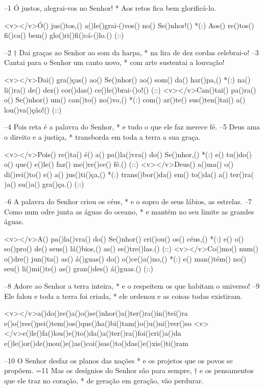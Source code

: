 –1 Ó justos, alegrai-vos no Senhor! *
Aos retos fica bem glorificá-lo.


<v></v>Ó() jus()tos,() a()le()grai-()vos() no() Se()nhor!() *(:)
Aos() re()tos() fi()ca() bem() glo()ri()fi()cá-()lo.() (::)

–2 † Dai graças ao Senhor ao som da harpa, *
na lira de dez cordas celebrai-o!
–3 Cantai para o Senhor um canto novo, *
com arte sustentai a louvação!

<v></v>Dai() gra()ças() ao() Se()nhor() ao() som() da() har()pa,() *(:)
na() li()ra() de() dez() cor()das() ce()le()brai-()o!() (::)
<v></v>Can()tai() pa()ra() o() Se()nhor() um() can()to() no()vo,() *(:)
com() ar()te() sus()ten()tai() a() lou()va()ção!() (::)

–4 Pois reta é a palavra do Senhor, *
e tudo o que ele faz merece fé.
–5 Deus ama o direito e a justiça, *
transborda em toda a terra a sua graça.

<v></v>Pois() re()ta() é() a() pa()la()vra() do() Se()nhor,() *(:)
e() tu()do() o() que() e()le() faz() me()re()ce() fé.() (::)
<v></v>Deus() a()ma() o() di()rei()to() e() a() jus()ti()ça,() *(:)
trans()bor()da() em() to()da() a() ter()ra( )a() su()a() gra()ça.() (::)

–6 A palavra do Senhor criou os céus, *
e o sopro de seus lábios, as estrelas.
–7 Como num odre junta as águas do oceano, *
e mantém no seu limite as grandes águas.

<v></v>A() pa()la()vra() do() Se()nhor() cri()ou() os() céus,() *(:)
e() o() so()pro() de() seus() lá()bios,() as() es()tre()las.() (::)
<v></v>Co()mo() num() o()dre() jun()ta() as() á()guas() do() o()ce()a()no,() *(:)
e() man()tém() no() seu() li()mi()te() as() gran()des() á()guas.() (::)

–8 Adore ao Senhor a terra inteira, *
e o respeitem os que habitam o universo!
–9 Ele falou e toda a terra foi criada, *
ele ordenou e as coisas todas existiram.

<v></v>a()do()re()a()o()se()nhor()a()ter()ra()in()tei()ra
e()o()res()pei()tem()os()que()ha()bi()tam()o()u()ni()ver()so
<v></v>e()le()fa()lou()e()to()da()a()ter()ra()foi()cri()a()da
e()le()or()de()nou()e()as()coi()sas()to()das()e()xis()ti()ram

–10 O Senhor desfaz os planos das nações *
e os projetos que os povos se propõem.
=11 Mas os desígnios do Senhor são para sempre, †
e os pensamentos que ele traz no coração, *
de geração em geração, vão perdurar.


